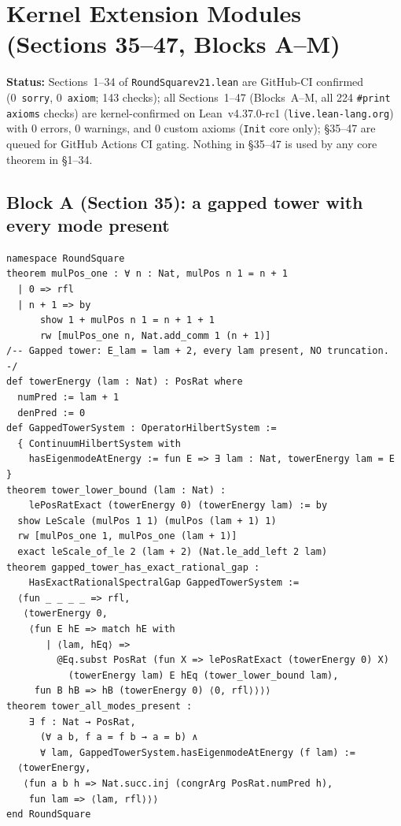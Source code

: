 \documentclass[11pt,a4paper]{article}
\theoremstyle{plain}
\theoremstyle{definition}
\theoremstyle{remark}
\renewcommand{\_}{\oldunderscore\allowbreak}
\begin{document}
\section{Kernel Extension Modules (Sections 35--47, Blocks A--M)}
\label{sec:proposed}
{\color{darkred}\textbf{Status:} Sections~1--34 of \texttt{RoundSquare\_v21.lean} are GitHub-CI confirmed (0~\texttt{sorry}, 0~\texttt{axiom}; 143 checks); all Sections~1--47 (Blocks~A--M, all 224 \texttt{\#print axioms} checks) are kernel-confirmed on Lean~v4.37.0-rc1 (\texttt{live.lean-lang.org}) with 0 errors, 0 warnings, and 0 custom axioms (\texttt{Init} core only); \S35--47 are queued for GitHub Actions CI gating. Nothing in \S35--47 is used by any core theorem in \S1--34.}
\subsection{Block A (Section 35): a gapped tower with every mode present}
\begin{lstlisting}
namespace RoundSquare
theorem mulPos_one : ∀ n : Nat, mulPos n 1 = n + 1
  | 0 => rfl
  | n + 1 => by
      show 1 + mulPos n 1 = n + 1 + 1
      rw [mulPos_one n, Nat.add_comm 1 (n + 1)]
/-- Gapped tower: E_lam = lam + 2, every lam present, NO truncation. -/
def towerEnergy (lam : Nat) : PosRat where
  numPred := lam + 1
  denPred := 0
def GappedTowerSystem : OperatorHilbertSystem :=
  { ContinuumHilbertSystem with
    hasEigenmodeAtEnergy := fun E => ∃ lam : Nat, towerEnergy lam = E }
theorem tower_lower_bound (lam : Nat) :
    lePosRatExact (towerEnergy 0) (towerEnergy lam) := by
  show LeScale (mulPos 1 1) (mulPos (lam + 1) 1)
  rw [mulPos_one 1, mulPos_one (lam + 1)]
  exact leScale_of_le 2 (lam + 2) (Nat.le_add_left 2 lam)
theorem gapped_tower_has_exact_rational_gap :
    HasExactRationalSpectralGap GappedTowerSystem :=
  ⟨fun _ _ _ _ => rfl,
   ⟨towerEnergy 0,
    ⟨fun E hE => match hE with
       | ⟨lam, hEq⟩ =>
         @Eq.subst PosRat (fun X => lePosRatExact (towerEnergy 0) X)
           (towerEnergy lam) E hEq (tower_lower_bound lam),
     fun B hB => hB (towerEnergy 0) ⟨0, rfl⟩⟩⟩⟩
theorem tower_all_modes_present :
    ∃ f : Nat → PosRat,
      (∀ a b, f a = f b → a = b) ∧
      ∀ lam, GappedTowerSystem.hasEigenmodeAtEnergy (f lam) :=
  ⟨towerEnergy,
   ⟨fun a b h => Nat.succ.inj (congrArg PosRat.numPred h),
    fun lam => ⟨lam, rfl⟩⟩⟩
end RoundSquare
\end{lstlisting}
\end{document}
